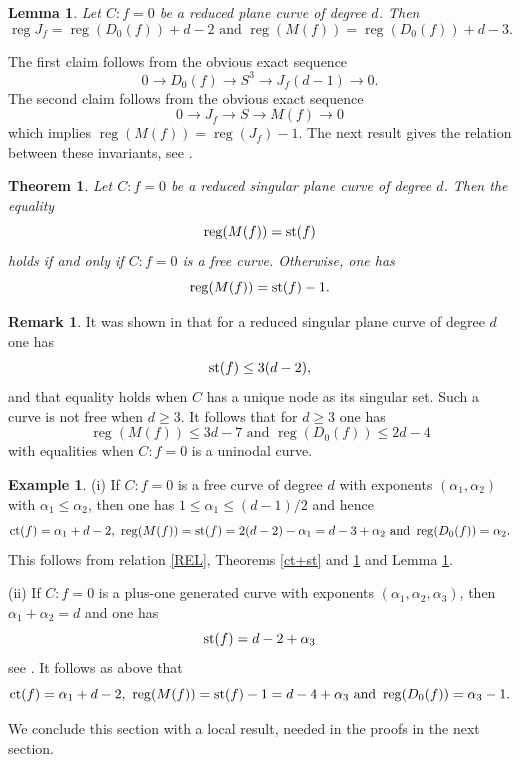\documentclass[12pt]{amsart}
\theoremstyle{plain}
\newtheorem{thm}[subsection]{Theorem}
\newtheorem{lem}[subsection]{Lemma}
\theoremstyle{definition}
\newtheorem{rk}[subsection]{Remark}
\newtheorem{ex}[subsection]{Example}
\numberwithin{equation}{section}
\newcommand{\al}{{\alpha}}
\DeclareMathOperator{\reg}{reg}
\begin{document}
\begin{lem}
\label{lem1}
Let $C:f=0$ be a reduced plane curve of degree $d$. Then
$$ \reg J_f=\reg(D_0(f))+d-2 \text{  and   } \reg(M(f))=\reg(D_0(f))+d-3.$$
\end{lem}
\proof
The first claim follows from the obvious exact sequence
$$0 \to D_0(f) \to S^3 \to J_f(d-1) \to 0.$$
The second claim follows from the obvious exact sequence
$$0 \to J_f \to S \to M(f) \to 0$$
which implies $\reg(M(f))=\reg(J_f)-1.$
\endproof
The next result gives the relation between these invariants, see \cite[Theorem 3.3]{DIM}.
\begin{thm}
\label{inv}
Let $C:f=0$ be a reduced singular plane curve of degree $d$. Then 
the equality $$ \reg(M(f)) = {\rm st}(f)$$ holds if and only if $C:f=0$ is a free curve. Otherwise, one has $$ \reg(M(f)) = {\rm st}(f)-1.$$
\end{thm}
\begin{rk}
\label{rkST}
It was shown in \cite[Theorem 1.5 and Example 4.3 (i)]{Edin} that
for a reduced singular plane curve of degree $d$ one has
$${\rm st}(f) \leq 3(d-2),$$
and that equality holds when $C$ has a unique node as its singular set.
Such a curve is not free when $d \geq 3$.
It follows that for $d \geq 3$ one has
$$ \reg(M(f)) \leq 3d-7 \text{ and }  \reg(D_0(f)) \leq 2d-4$$
with equalities when $C:f=0$ is a uninodal curve.

\end{rk}
\begin{ex}
\label{exST}
(i) If $C:f=0$ is a free curve of degree $d$ with exponents $(\al_1,\al_2)$ with $\al_1 \leq \al_2$, then one has $1 \leq \al_1 \leq (d-1)/2$ and hence
$${\rm ct}(f)=\al_1+d-2, \  \reg(M(f)) = {\rm st}(f)=2(d-2)-\al_1=d-3+\al_2  \text{ and }
\reg(D_0(f))=\al_2.$$
This follows from relation \eqref{REL}, Theorems \ref{ct+st} and \ref{inv} and Lemma \ref{lem1}.

(ii) If $C:f=0$ is a plus-one generated curve with exponents $(\al_1,\al_2,\al_3)$, then $\al_1+\al_2=d$ and one has
$$ {\rm st}(f)=d-2+\al_3$$
see \cite[Proposition 2.1]{3-syz}. It follows as above that
$${\rm ct}(f)=\al_1+d-2, \  \reg(M(f)) = {\rm st}(f)-1=d-4+\al_3  \text{ and }
\reg(D_0(f))=\al_3-1.$$

\end{ex}
We conclude this section with a local result, needed in the proofs in the next section.
\end{document}
